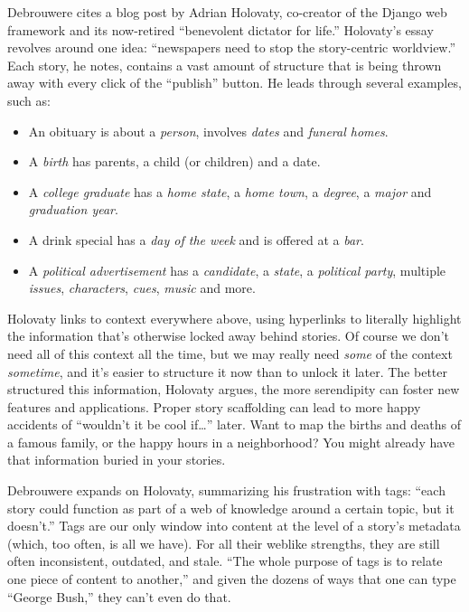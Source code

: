 Debrouwere cites a blog post by Adrian Holovaty, co-creator of the Django web framework and its now-retired ``benevolent dictator for life.'' Holovaty's essay revolves around one idea: ``newspapers need to stop the story-centric worldview.''\autocite{holovaty_fundamental_2006} Each story, he notes, contains a vast amount of structure that is being thrown away with every click of the ``publish'' button. He leads through several examples, such as: \begin{itemize}
\item An obituary is about a \emph{person}, involves \emph{dates} and \emph{funeral homes}.
\item A \emph{birth} has parents, a child (or children) and a date.
\item A \emph{college graduate} has a \emph{home state}, a \emph{home town}, a \emph{degree}, a \emph{major} and \emph{graduation year}.
\item A drink special has a \emph{day of the week} and is offered at a \emph{bar}.
\item A \emph{political advertisement} has a \emph{candidate}, a \emph{state}, a \emph{political party}, multiple \emph{issues}, \emph{characters}, \emph{cues}, \emph{music} and more.\end{itemize}

\noindent Holovaty links to context everywhere above, using hyperlinks to literally highlight the information that's otherwise locked away behind stories. Of course we don't need all of this context all the time, but we may really need \emph{some} of the context \emph{sometime}, and it's easier to structure it now than to unlock it later. The better structured this information, Holovaty argues, the more serendipity can foster new features and applications. Proper story scaffolding can lead to more happy accidents of ``wouldn't it be cool if\ldots'' later. Want to map the births and deaths of a famous family, or the happy hours in a neighborhood? You might already have that information buried in your stories.

Debrouwere expands on Holovaty, summarizing his frustration with tags: ``each story could function as part of a web of knowledge around a certain topic, but it doesn't.'' Tags are our only window into content at the level of a story's metadata (which, too often, is all we have). For all their weblike strengths, they are still often inconsistent, outdated, and stale. ``The whole purpose of tags is to relate one piece of content to another,'' and given the dozens of ways that one can type ``George Bush,'' they can't even do that.

